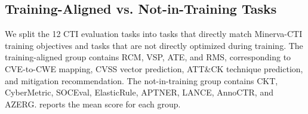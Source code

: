 \begin{table}[t]
\centering
\scriptsize
\caption{Task-count summary for training-aligned and not-in-training tasks among the 12 CTI evaluation tasks. Counts are over backbone-task comparisons. Aligned tasks are RCM, VSP, ATE, and RMS; not-in-training tasks are the remaining eight tasks. CI Pos./Neg./Overlap indicate whether the paired bootstrap 95\% confidence interval for MinervaRL minus the comparison model is entirely above zero, below zero, or overlaps zero.}
\label{tab:seen-vs-heldout-counts}
\setlength{\tabcolsep}{2.3pt}
\renewcommand{\arraystretch}{0.92}
\end{table}

\subsection{Training-Aligned vs. Not-in-Training Tasks}
\label{sec:intrain-vs-heldout}

We split the 12 CTI evaluation tasks into tasks that directly match Minerva-CTI training objectives and tasks that are not directly optimized during training. The training-aligned group contains RCM, VSP, ATE, and RMS, corresponding to CVE-to-CWE mapping, CVSS vector prediction, ATT\&CK technique prediction, and mitigation recommendation. The not-in-training group contains CKT, CyberMetric, SOCEval, ElasticRule, APTNER, LANCE, AnnoCTR, and AZERG.  reports the mean score for each group.

